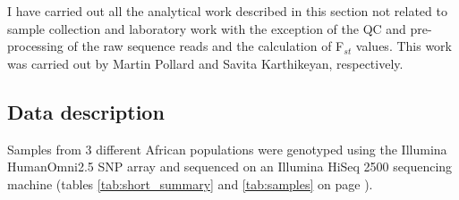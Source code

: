I have carried out all the analytical work described in this section not related to sample collection and laboratory work with the exception of the QC and pre-processing of the raw sequence reads and the calculation of F$_{st}$ values. This work was carried out by Martin Pollard and Savita Karthikeyan, respectively.

\subsection{Data description}
\label{sec:downsampling_datadescription}
Samples from 3 different African populations were genotyped using the Illumina HumanOmni2.5 SNP array and sequenced on an Illumina HiSeq 2500 sequencing machine (tables \ref{tab:short_summary} and \ref{tab:samples} on page \pageref{tab:samples}).

